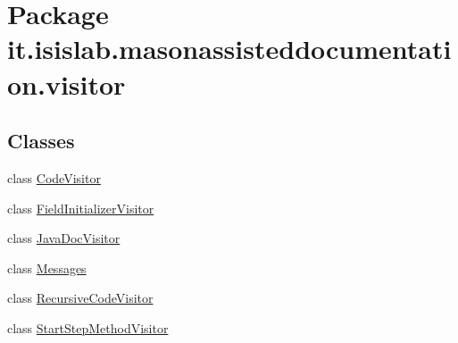 \hypertarget{namespaceit_1_1isislab_1_1masonassisteddocumentation_1_1visitor}{\section{Package it.\-isislab.\-masonassisteddocumentation.\-visitor}
\label{namespaceit_1_1isislab_1_1masonassisteddocumentation_1_1visitor}
}
\subsection*{Classes}
\begin{DoxyCompactItemize}
\item 
class \hyperlink{classit_1_1isislab_1_1masonassisteddocumentation_1_1visitor_1_1_code_visitor}{Code\-Visitor}
\item 
class \hyperlink{classit_1_1isislab_1_1masonassisteddocumentation_1_1visitor_1_1_field_initializer_visitor}{Field\-Initializer\-Visitor}
\item 
class \hyperlink{classit_1_1isislab_1_1masonassisteddocumentation_1_1visitor_1_1_java_doc_visitor}{Java\-Doc\-Visitor}
\item 
class \hyperlink{classit_1_1isislab_1_1masonassisteddocumentation_1_1visitor_1_1_messages}{Messages}
\item 
class \hyperlink{classit_1_1isislab_1_1masonassisteddocumentation_1_1visitor_1_1_recursive_code_visitor}{Recursive\-Code\-Visitor}
\item 
class \hyperlink{classit_1_1isislab_1_1masonassisteddocumentation_1_1visitor_1_1_start_step_method_visitor}{Start\-Step\-Method\-Visitor}
\end{DoxyCompactItemize}
